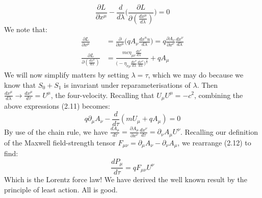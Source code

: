 \documentclass[a4paper]{article}
\numberwithin{equation}{section}
\begin{document}
\begin{equation}
\frac{\partial L}{\partial x^\mu}-\frac{d}{d\lambda}\bigg(\frac{\partial L}{\partial(\frac{dx^\mu}{d\lambda})}\bigg)=0
\end{equation}
We note that:
\begin{align*}
\frac{\partial L}{\partial x^\mu} &= \frac{\partial}{\partial x^\mu} \bigg( qA_\nu \frac{d x^nu}{d\lambda} \bigg) = q\frac{\partial A_\nu}{\partial x^\nu}\frac{dx^\nu}{d \lambda} \\
\frac{\partial L}{\partial (\frac{dx^\mu}{d\lambda})}&=\frac{mc \eta_{\mu \nu} \frac{dx^\nu}{d\lambda}}{\big(-\eta_{\sigma \rho}\frac{dx^\sigma}{d\lambda}\frac{dx^\rho}{d\lambda}\big)^\frac{1}{2}}+qA_\mu
\end{align*}
We will now simplify matters by setting $\lambda = \tau$, which we may do because we know that $S_0+S_1$ is invariant under reparameterisations of $\lambda$. Then $\frac{dx^\mu}{d \lambda} \rightarrow \frac{dx^\mu}{d\tau}=U^\mu$, the four-velocity. Recalling that $U_\mu U^\mu = -c^2$, combining the above expressions (2.11) becomes:
\begin{equation}
q\partial_\mu A_\nu - \frac{d}{d\tau}(mU_\mu+qA_\mu)=0
\end{equation}
By use of the chain rule, we have $\frac{dA_\mu}{d\tau}= \frac{\partial A_\mu}{\partial x^\nu}\frac{dx^\nu}{d\tau}=\partial_\nu A_\mu U^\nu$. Recalling our definition of the Maxwell field-strength tensor $F_{\mu \nu}=\partial_\mu A_\nu - \partial_\nu A_\mu$, we rearrange (2.12) to find:
\begin{equation}
\frac{dP_\mu}{d\tau}=qF_{\mu \nu}U^\nu 
\end{equation}
Which is the Lorentz force law! We have derived the well known result by the principle of least action. All is good.
\end{document}
